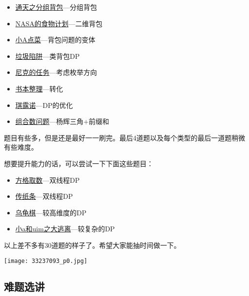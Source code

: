 \begin{itemize}
		\item{\href{https://www.luogu.org/problem/show?pid=1757}{通天之分组背包}---分组背包}
		\item{\href{https://www.luogu.org/problem/show?pid=1507}{NASA的食物计划}---二维背包}
		\item{\href{https://www.luogu.org/problem/show?pid=1164}{小A点菜}---背包问题的变体}
		\item{\href{https://www.luogu.org/problem/show?pid=1156}{垃圾陷阱}---类背包DP}
		\item{\href{https://www.luogu.org/problem/show?pid=1280}{尼克的任务}---考虑枚举方向}
		\item{\href{https://www.luogu.org/problem/show?pid=1103}{书本整理}---转化}
		\item{\href{https://www.luogu.org/problem/show?pid=1725}{琪露诺}---DP的优化}
		\item{\href{https://www.luogu.org/problem/show?pid=2822}{组合数问题}---杨辉三角+前缀和}
	\end{itemize}

	题目有些多，但是还是最好一一刷完。最后4道题以及每个类型的最后一道题稍微有些难度。

	想要提升能力的话，可以尝试一下下面这些题目：
	\begin{itemize}
		\item{\href{https://www.luogu.org/problem/show?pid=1004}{方格取数}---双线程DP}
		\item{\href{https://www.luogu.org/problem/show?pid=1006}{传纸条}---双线程DP}
		\item{\href{https://www.luogu.org/problem/show?pid=1541}{乌龟棋}---较高维度的DP}
		\item{\href{https://www.luogu.org/problem/show?pid=1373}{小a和uim之大逃离}---较复杂的DP}
	\end{itemize}

	以上差不多有30道题的样子了。希望大家能抽时间做一下。

	\begin{center}\texttt{[image: 33237093\_p0.jpg]}\end{center}

	\newpage
	\subsection{难题选讲}
